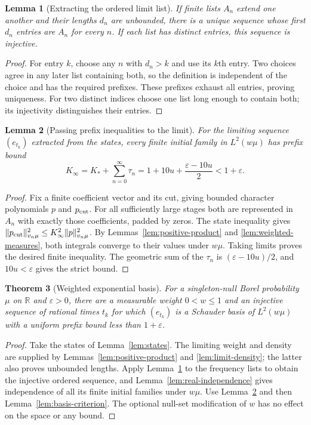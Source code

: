 \documentclass[reqno,a4paper,12pt]{amsart}
\newtheorem{theorem}{Theorem}[section]
\newtheorem{lemma}[theorem]{Lemma}
\theoremstyle{definition}
\newcommand{\R}{\mathbb R}
\begin{document}
\begin{lemma}[Extracting the ordered limit list]\label{lem:ordered-limit}
If finite lists $A_n$ extend one another and their lengths $d_n$
are unbounded, there is a unique sequence whose first $d_n$ entries
are $A_n$ for every $n$. If each list has distinct entries, this
sequence is injective.
\end{lemma}
\begin{proof}
For entry $k$, choose any $n$ with $d_n>k$ and use its $k$th entry.
Two choices agree in any later list containing both, so the definition
is independent of the choice and has the required prefixes.
These prefixes exhaust all entries, proving uniqueness.
For two distinct indices choose one list long enough to contain both;
its injectivity distinguishes their entries.
\end{proof}

\begin{lemma}[Passing prefix inequalities to the limit]
\label{lem:limit-prefix}
For the limiting sequence $(e_{t_k})$ extracted from the states,
every finite initial family in $L^2(w\mu)$ has prefix bound
\[
 K_\infty=K_*+\sum_{n=0}^\infty\tau_n
 =1+10u+\frac{\varepsilon-10u}{2}<1+\varepsilon.
\]
\end{lemma}
\begin{proof}
Fix a finite coefficient vector and its cut, giving bounded
character polynomials $p$ and $p_{\rm cut}$.
For all sufficiently large stages both are represented in $A_n$
with exactly those coefficients, padded by zeros.
The state inequality gives
$\|p_{\rm cut}\|_{v_n\mu}^2\le K_\infty^2\|p\|_{v_n\mu}^2$.
By Lemmas~\ref{lem:positive-product} and \ref{lem:weighted-measures},
both integrals converge to their values under $w\mu$. Taking limits
proves the desired finite inequality.
The geometric sum of the $\tau_n$ is
$(\varepsilon-10u)/2$, and $10u<\varepsilon$ gives the strict bound.
\end{proof}

\begin{theorem}[Weighted exponential basis]\label{thm:weighted}
For a singleton-null Borel probability $\mu$ on $\R$ and
$\varepsilon>0$, there are a measurable weight $0<w\le1$ and an
injective sequence of rational times $t_k$ for which $(e_{t_k})$
is a Schauder basis of $L^2(w\mu)$ with a uniform prefix bound
less than $1+\varepsilon$.
\end{theorem}
\begin{proof}
Take the states of Lemma~\ref{lem:states}. The limiting weight and
density are supplied by Lemmas~\ref{lem:positive-product} and
\ref{lem:limit-density}; the latter also proves unbounded lengths.
Apply Lemma~\ref{lem:ordered-limit} to the frequency lists to obtain
the injective ordered sequence,
and Lemma~\ref{lem:real-independence} gives independence of all its
finite initial families under $w\mu$.
Use Lemma~\ref{lem:limit-prefix} and then
Lemma~\ref{lem:basis-criterion}. The optional null-set modification
of $w$ has no effect on the space or any bound.
\end{proof}
\end{document}
